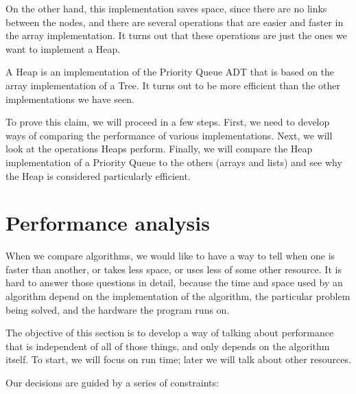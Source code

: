 \documentclass[12pt]{book}
\theoremstyle{exercise}
\begin{document}
On the other hand, this implementation saves space, since there are
no links between the nodes, and
there are several operations that are easier and faster
in the array implementation.  It turns out that these operations
are just the ones we want to implement a Heap.

A Heap is an implementation of the Priority Queue
ADT that is based on the array implementation of a Tree.  It
turns out to be more efficient than the other implementations
we have seen.

To prove this claim, we will proceed in a few steps.
First, we need to develop ways of comparing the performance of
various implementations.  Next, we will look at the operations
Heaps perform.  Finally, we will compare the Heap implementation
of a Priority Queue to the others (arrays and lists) and see
why the Heap is considered particularly efficient.


\section {Performance analysis}

When we compare algorithms, we would like to have a way to tell
when one is faster than another, or takes less space, or uses less
of some other resource.  It is hard to answer those questions in
detail, because the time and space used by an algorithm depend on the
implementation of the algorithm, the particular problem being
solved, and the hardware the program runs on.

The objective of this section is to develop a way of talking about
performance that is independent of all of those things, and only
depends on the algorithm itself.  To start, we will focus on run
time; later we will talk about other resources.

Our decisions are guided by a series of constraints:
\end{document}
